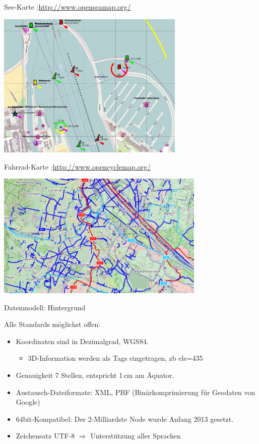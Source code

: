 \documentclass{beamer}
\begin{document}
\begin{frame}{See-Karte :\hfill\url{http://www.openseamap.org/}}
\begin{center}
\includegraphics[height=7cm]{style-seamap.png}
\end{center}
\end{frame}

\begin{frame}{Fahrrad-Karte :\hfill\url{http://www.opencyclemap.org/}}
\begin{center}
\includegraphics[height=6cm]{style-cycle.png}
\end{center}
\end{frame}

\begin{frame}{Datenmodell: Hintergrund}

Alle Standards möglichst offen:

\begin{itemize}
  \item Koordinaten sind in Dezimalgrad, WGS84.
  \begin{itemize}
  \item 3D-Information werden als Tags eingetragen, zb ele=435
\end{itemize}
  \item Genauigkeit 7 Stellen, entspricht 1\,cm am Äquator.
  \item Austausch-Dateiformate: XML, PBF (Binärkomprimierung für Geodaten von Google)
  \item 64bit-Kompatibel: Der 2-Milliardste Node wurde Anfang 2013 gesetzt.
\pause
  \item Zeichensatz UTF-8 $\Rightarrow$ Unterstützung aller Sprachen
\end{itemize}

\end{frame}
\end{document}
